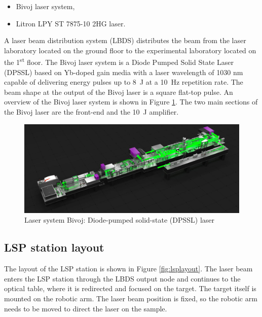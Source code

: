\begin{itemize}
  \item Bivoj laser system,
  \item Litron LPY ST 7875-10 2HG laser.
\end{itemize}

 A laser beam distribution system (LBDS) distributes the beam from the laser laboratory located on the ground floor to the experimental laboratory located on the 1\textsuperscript{st} floor. The Bivoj laser system is a Diode Pumped Solid State Laser (DPSSL) based on Yb-doped gain media with a laser wavelength of 1030 nm capable of delivering energy pulses up to \SI{8}{\joule} at a \SI{10}{\hertz} repetition rate. The beam shape at the output of the Bivoj laser is a square flat-top pulse. An overview of the Bivoj laser system is shown in Figure \ref{fig:bivoj}. The two main sections of the Bivoj laser are the front-end and the \SI{10}{\joule} amplifier.
 
 \begin{figure}[h]
    \centering
    \includegraphics[width=1.0\linewidth]{img/bivoj.jpg}
    \caption{Laser system Bivoj: Diode-pumped solid-state (DPSSL) laser \cite{bivojiso}}
    \label{fig:bivoj}
\end{figure}
 
 \subsection{LSP station layout}

The layout of the LSP station is shown in Figure \ref{fig:lsplayout}. The laser beam enters the LSP station through the LBDS output node and
continues to the optical table, where it is redirected and
focused on the target. The target itself is mounted on the
robotic arm. The laser beam position is fixed, so the robotic
arm needs to be moved to direct the laser on the sample.

